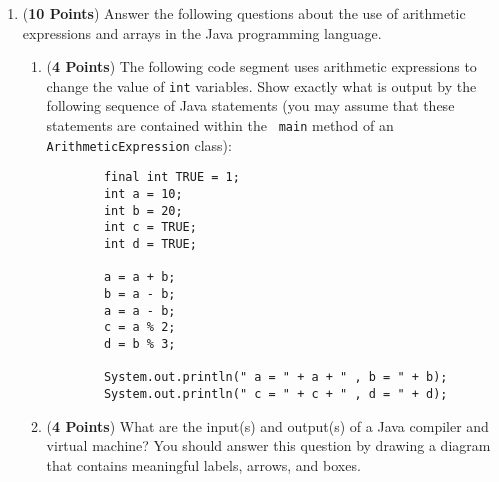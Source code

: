 \documentclass[12pt]{article}
\begin{document}
\begin{enumerate}
\begin{enumerate}
\end{enumerate}

\newpage

\item ({\bf 10 Points}) Answer the following questions about the use
  of arithmetic expressions and arrays in the Java programming
  language.

\begin{enumerate}

\item ({\bf 4 Points}) The following code segment uses arithmetic
  expressions to change the value of {\tt int} variables.  Show
  exactly what is output by the following sequence of Java statements
  (you may assume that these statements are contained within the {\tt
    main} method of an {\tt ArithmeticExpression} class):

\begin{verbatim}
        final int TRUE = 1;
        int a = 10;
        int b = 20;
        int c = TRUE;
        int d = TRUE;
        
        a = a + b;
        b = a - b;
        a = a - b;
        c = a % 2;
        d = b % 3;
        
        System.out.println(" a = " + a + " , b = " + b);
        System.out.println(" c = " + c + " , d = " + d);
\end{verbatim}

\item ({\bf 4 Points}) What are the input(s) and output(s) of a Java
  compiler and virtual machine?  You should answer this question by
  drawing a diagram that contains meaningful labels, arrows, and
  boxes.




\end{enumerate}
\end{enumerate}
\end{document}
